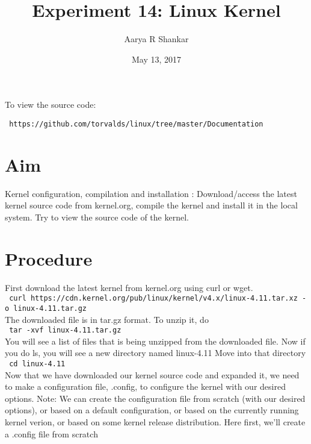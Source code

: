 \documentclass[12pt,a4paper]{article}
\title{Experiment 14: Linux Kernel}
\author{Aarya R Shankar}
\date{May 13, 2017}
\begin{document}
\maketitle
\begin{center}
To view the source code:

\texttt{\ https://github.com/torvalds/linux/tree/master/Documentation}
\end{center}
\section{Aim}
 
Kernel configuration, compilation and installation : Download/access the latest kernel source code from kernel.org, compile the kernel and install it in the local system. Try to view the source code of the kernel.

\section{Procedure}

First download the latest kernel from kernel.org using curl or wget.\\
\newline
\texttt{\ curl https://cdn.kernel.org/pub/linux/kernel/v4.x/linux-4.11.tar.xz -o linux-4.11.tar.gz}\\
\newline
The downloaded file is in tar.gz format. To unzip it, do\\
\newline
\texttt{\ tar -xvf linux-4.11.tar.gz}\\
\newline
You will see a list of files that is being unzipped from the downloaded file.
Now if you do ls, you will see a new directory named linux-4.11
Move into that directory\\
\newline
\texttt{\ cd linux-4.11}\\
\newline
Now that we have downloaded our kernel source code and expanded it, we need to make a configuration file, .config, to configure the kernel with our desired options.
Note: We can create the configuration file from scratch (with our desired options), or based on a default configuration, or based on the currently running kernel verion, or based on some kernel release distribution. Here first, we'll create a .config file from scratch\\
\end{document}
